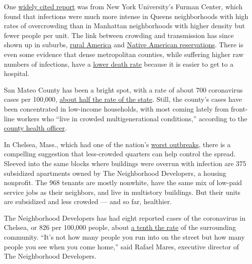 One
\href{https://furmancenter.org/thestoop/entry/covid-19-cases-in-new-york-city-a-neighborhood-level-analysis}{widely
cited report} was from New York University's Furman Center, which found
that infections were much more intense in Queens neighborhoods with high
rates of overcrowding than in Manhattan neighborhoods with higher
density but fewer people per unit. The link between crowding and
transmission has since shown up in suburbs,
\href{https://www.wsj.com/articles/covid-19-households-spread-coronavirus-families-navajo-california-second-wave-11591553896}{rural
America} and
\href{https://www.azcentral.com/story/news/local/arizona-health/2020/05/12/close-knit-navajo-nation-communities-arizona-virus-takes-hold/3115961001/}{Native
American reservations}. There is even some evidence that dense
metropolitan counties, while suffering higher raw numbers of infections,
have a
\href{https://www.ncbi.nlm.nih.gov/pmc/articles/PMC7315990/}{lower death
rate} because it is easier to get to a hospital.

San Mateo County has been a bright spot, with a rate of about 700
coronavirus cases per 100,000,
\href{https://www.nytimes.com/interactive/2020/us/california-coronavirus-cases.html}{about
half the rate of the state}. Still, the county's cases have been
concentrated in low-income households, with most coming lately from
front-line workers who ``live in crowded multigenerational conditions,''
according to the
\href{https://www.smchealth.org/coronavirus-health-officer-updates}{county
health officer}.

In Chelsea, Mass., which had one of the nation's
\href{https://www.nytimes.com/2020/04/25/us/coronavirus-chelsea-massachusetts.html}{worst
outbreaks}, there is a compelling suggestion that less-crowded quarters
can help control the spread. Sleeved into the same blocks where
buildings were overrun with infection are 375 subsidized apartments
owned by The Neighborhood Developers, a housing nonprofit. The 968
tenants are mostly nonwhite, have the same mix of low-paid service jobs
as their neighbors, and live in multistory buildings. But their units
are subsidized and less crowded --- and so far, healthier.

The Neighborhood Developers has had eight reported cases of the
coronavirus in Chelsea, or 826 per 100,000 people, about
\href{https://www.mass.gov/doc/weekly-covid-19-public-health-report-july-22-2020/download}{a
tenth the rate} of the surrounding community. ``It's not how many people
you run into on the street but how many people you see when you come
home,'' said Rafael Mares, executive director of The Neighborhood
Developers.

